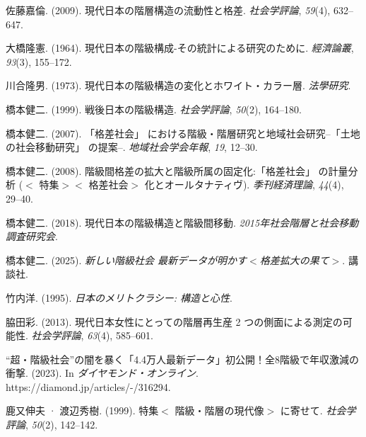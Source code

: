 \documentclass[
  letterpaper,
  DIV=11,
  numbers=noendperiod]{scrartcl}
\newlength{\cslhangindent}
\newenvironment{CSLReferences}[2] %
 {\begin{list}{}{%
  \setlength{\itemindent}{0pt}
  \setlength{\leftmargin}{0pt}
  \setlength{\parsep}{0pt}
  \ifodd #1
   \setlength{\leftmargin}{\cslhangindent}
   \setlength{\itemindent}{-1\cslhangindent}
  \fi
  \setlength{\itemsep}{#2\baselineskip}}}
 {\end{list}}
\begin{document}
\begin{CSLReferences}{1}{0}
佐藤嘉倫. (2009). 現代日本の階層構造の流動性と格差. \emph{社会学評論},
\emph{59}(4), 632--647.

大橋隆憲. (1964). 現代日本の階級構成-その統計による研究のために.
\emph{經濟論叢}, \emph{93}(3), 155--172.

川合隆男. (1973). 現代日本の階級構造の変化とホワイト・カラー層.
\emph{法學研究}.

橋本健二. (1999). 戦後日本の階級構造. \emph{社会学評論}, \emph{50}(2),
164--180.

橋本健二. (2007). 「格差社会」
における階級・階層研究と地域社会研究--「土地の社会移動研究」 の提案--.
\emph{地域社会学会年報}, \emph{19}, 12--30.

橋本健二. (2008). 階級間格差の拡大と階級所属の固定化:「格差社会」
の計量分析 ({\(<\)} 特集{\(><\)} 格差社会{\(>\)} 化とオールタナティヴ).
\emph{季刊経済理論}, \emph{44}(4), 29--40.

橋本健二. (2018). 現代日本の階級構造と階級間移動.
\emph{2015年社会階層と社会移動調査研究会}.

橋本健二. (2025). \emph{{新しい階級社会
最新データが明かす{\(<\)}格差拡大の果て{\(>\)}}}. 講談社.

竹内洋. (1995). \emph{日本のメリトクラシー: 構造と心性}.

脇田彩. (2013). 現代日本女性にとっての階層再生産 2
つの側面による測定の可能性. \emph{社会学評論}, \emph{63}(4), 585--601.

{{``超・階級社会''}の闇を暴く「4.4万人最新データ」初公開！全8階級で年収激減の衝撃}.
(2023). In \emph{ダイヤモンド・オンライン}.
https://diamond.jp/articles/-/316294.

鹿又伸夫 · 渡辺秀樹. (1999). 特集{\(<\)} 階級・階層の現代像{\(>\)}
に寄せて. \emph{社会学評論}, \emph{50}(2), 142--142.

\end{CSLReferences}
\end{document}
